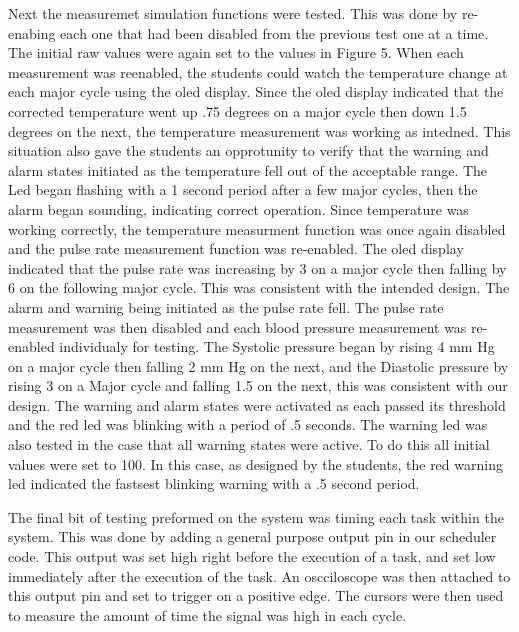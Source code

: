\documentclass[12pt]{article} %
\begin{document}
Next the measuremet simulation functions were tested. This was done by
re-enabing each one that had been disabled from the previous test one at a
time. The initial raw values were again set to the values in Figure 5. When
each measurement was reenabled, the students could watch the temperature change
at each major cycle using the oled display. Since the oled display indicated
that the corrected temperature went up .75 degrees on a major cycle then down
1.5 degrees on the next, the temperature measurement was working as intedned.
This situation also gave the students an opprotunity to verify that the warning
and alarm states initiated as the temperature fell out of the acceptable range.
The Led began flashing with a 1 second period after a few major cycles, then
the alarm began sounding, indicating correct operation. Since temperature was
working correctly, the temperature measurment function was once again disabled
and the pulse rate measurement function was re-enabled. The oled display
indicated that the pulse rate was increasing by 3 on a major cycle then falling
by 6 on the following major cycle. This was consistent with the intended
design. The alarm and warning being initiated as the pulse rate fell. The pulse
rate measurement was then disabled and each blood pressure measurement was
re-enabled individualy for testing. The Systolic pressure began by rising 4 mm
Hg on a major cycle then falling 2 mm Hg on the next, and the Diastolic
pressure by rising 3 on a Major cycle and falling 1.5 on the next, this was
consistent with our design. The warning and alarm states were activated as each
passed its threshold and the red led was blinking with a period of .5 seconds.
The warning led was also tested in the case that all warning states were
active. To do this all initial values were set to 100. In this case, as
designed by the students, the red warning led indicated the fastsest blinking
warning with a .5 second period. 

The final bit of testing preformed on the system was timing each task within
the system. This was done by adding a general purpose output pin in our
scheduler code. This output was set high right before the execution of a task,
and set low immediately after the execution of the task. An oscciloscope was
then attached to this output pin and set to trigger on a positive edge. The
cursors were then used to measure the amount of time the signal was high in
each cycle.
	
\end{document}
